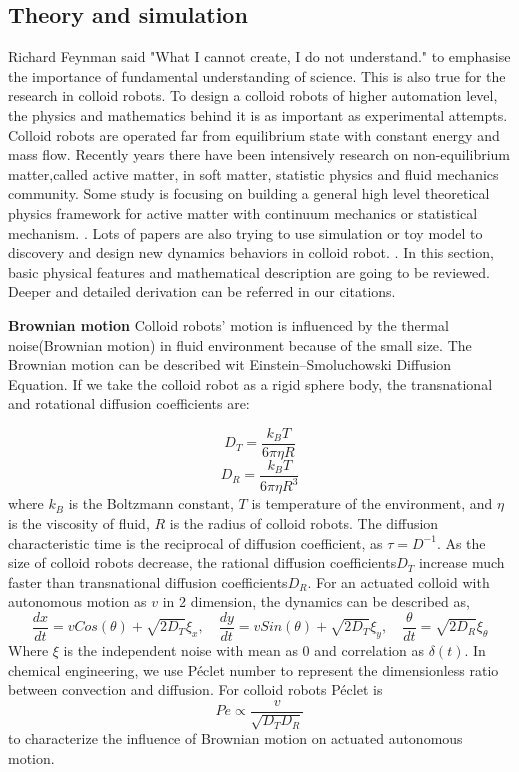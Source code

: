 \subsection{Theory and simulation}
Richard Feynman said "What I cannot create, I do not understand." to emphasise the importance of fundamental understanding of science. This is also true for the  research in colloid robots. To design a colloid robots of higher automation level, the physics and mathematics behind it is as  important as  experimental attempts. Colloid robots are operated far from equilibrium state with constant energy and mass flow. Recently years there have been intensively research on non-equilibrium matter,called active matter, in soft matter, statistic physics and fluid mechanics community. Some study is focusing on building a general high level theoretical physics framework for active matter with continuum mechanics or statistical mechanism. \cite{stenhammar2013continuum,solon2015pressure,fodor2016far}. Lots of papers are also trying to use simulation or toy model to discovery and design new dynamics behaviors in colloid robot. \cite{bechinger2016active,speck2014effective,ten2011brownian}. In this section,  basic physical features and mathematical description are going to be reviewed.  Deeper and detailed derivation can be referred in our citations.

\textbf{Brownian motion} Colloid robots' motion is influenced by the thermal noise(Brownian motion) in fluid environment because of the small size. The Brownian motion can be described wit Einstein–Smoluchowski Diffusion Equation.\cite{islam2004einstein} If we take the colloid robot as  a rigid sphere body, the transnational and rotational diffusion coefficients are: 

\begin{equation}
    D_T=\frac{k_B T}{6 \pi \eta R }
\end{equation}
\begin{equation}
    D_R=\frac{k_B T}{6 \pi \eta R^3 }
\end{equation}
where $k_B$ is the Boltzmann constant, $T$ is temperature of the environment, and $\eta$ is the viscosity of fluid, $R$ is the radius of colloid robots. The diffusion characteristic time is the 
reciprocal of diffusion coefficient, as  $\tau=D^{-1}$. As the size of colloid robots decrease, the rational diffusion coefficients$D_T$ increase much faster than transnational diffusion coefficients$D_R$. For an actuated colloid with autonomous motion as $v$ in 2 dimension, the dynamics can be described as,
\begin{equation}
    \frac{dx}{dt}=v Cos(\theta)+\sqrt{2 D_T}\xi_x, \quad \frac{dy}{dt}=v Sin(\theta)+\sqrt{2 D_T}\xi_y,\quad
    \frac{\theta}{dt}=\sqrt{2 D_R}\xi_\theta
\end{equation}
Where $\xi$ is the independent noise with mean as $0$ and correlation as $\delta(t)$. In chemical engineering, we use Péclet number to represent the dimensionless ratio between convection  and diffusion. For colloid robots  Péclet is 
\begin{equation}
    Pe\propto\frac{v}{\sqrt{D_T D_R}}
\end{equation}
to characterize the influence of Brownian motion on  actuated autonomous motion.

